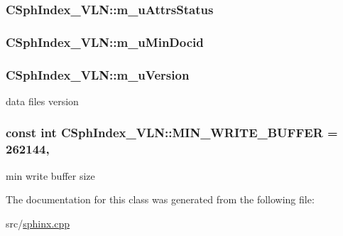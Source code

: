 \hypertarget{classCSphIndex__VLN_a391dbb57434b6eee37e1bd7c61f9e5c9}{
\subsubsection[{m\-\_\-u\-Attrs\-Status}]{ C\-Sph\-Index\-\_\-\-V\-L\-N\-::m\-\_\-u\-Attrs\-Status\hspace{0.3cm}{\ttfamily [private]}}}\label{classCSphIndex__VLN_a391dbb57434b6eee37e1bd7c61f9e5c9}
\hypertarget{classCSphIndex__VLN_a35b0482c8ed0e2722d10435b7c27d73c}{
\subsubsection[{m\-\_\-u\-Min\-Docid}]{ C\-Sph\-Index\-\_\-\-V\-L\-N\-::m\-\_\-u\-Min\-Docid\hspace{0.3cm}{\ttfamily [private]}}}\label{classCSphIndex__VLN_a35b0482c8ed0e2722d10435b7c27d73c}
\hypertarget{classCSphIndex__VLN_ad0f2135353d82298028168bfb907d56d}{
\subsubsection[{m\-\_\-u\-Version}]{ C\-Sph\-Index\-\_\-\-V\-L\-N\-::m\-\_\-u\-Version\hspace{0.3cm}{\ttfamily [private]}}}\label{classCSphIndex__VLN_ad0f2135353d82298028168bfb907d56d}


data files version 

\hypertarget{classCSphIndex__VLN_aa3de81463a2b666539e60665c2077b04}{
\subsubsection[{M\-I\-N\-\_\-\-W\-R\-I\-T\-E\-\_\-\-B\-U\-F\-F\-E\-R}]{\setlength{\rightskip}{0pt plus 5cm}const {\bf int} C\-Sph\-Index\-\_\-\-V\-L\-N\-::\-M\-I\-N\-\_\-\-W\-R\-I\-T\-E\-\_\-\-B\-U\-F\-F\-E\-R = 262144\hspace{0.3cm}{\ttfamily [static]}, {\ttfamily [private]}}}\label{classCSphIndex__VLN_aa3de81463a2b666539e60665c2077b04}


min write buffer size 



The documentation for this class was generated from the following file\-:\begin{DoxyCompactItemize}
\item 
src/\hyperlink{sphinx_8cpp}{sphinx.\-cpp}\end{DoxyCompactItemize}

